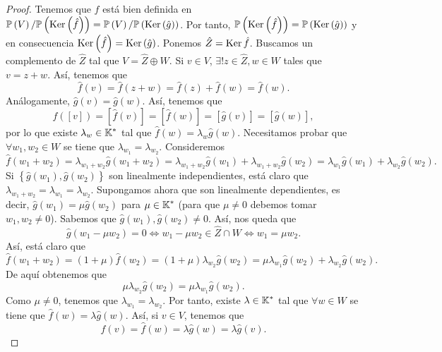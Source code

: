 \begin{proof}
	Tenemos que $\displaystyle f $ está bien definida en $\displaystyle \mathbb{P}\left(V\right)/\mathbb{P}\left(\operatorname{Ker}\left(\hat{f}\right)\right) = \mathbb{P}\left(V\right)/\mathbb{P}\left(\operatorname{Ker}\left(\hat{g}\right)\right) $. Por tanto, $\displaystyle \mathbb{P}\left(\operatorname{Ker}\left(\hat{f}\right)\right) = \mathbb{P}\left(\operatorname{Ker}\left(\hat{g}\right)\right) $ y en consecuencia $\displaystyle \operatorname{Ker}\left(\hat{f}\right) = \operatorname{Ker}\left(\hat{g}\right) $. Ponemos $\displaystyle \hat{Z} = \operatorname{Ker} \hat{f}$. 
	Buscamos un complemento de $\displaystyle \hat{Z} $ tal que $\displaystyle V = \hat{Z} \oplus W $. Si $\displaystyle v \in V $, $\displaystyle \exists ! z \in \hat{Z}, w \in W $ tales que $\displaystyle v = z + w $. Así, tenemos que 
	\[\hat{f}\left(v\right) = \hat{f}\left(z + w\right) = \hat{f}\left(z\right) + \hat{f}\left(w\right) = \hat{f}\left(w\right) .\]
	Análogamente, $\displaystyle \hat{g}\left(v\right) = \hat{g}\left(w\right) $. Así, tenemos que 
	\[f\left([v]\right) = [\hat{f}\left(v\right)] = [\hat{f}\left(w\right)] = [\hat{g}\left(v\right)] = [\hat{g}\left(w\right)] ,\]
	por lo que existe $\displaystyle \lambda_{w} \in \mathbb{K}^{*} $ tal que $\displaystyle \hat{f}\left(w\right) = \lambda_{w}\hat{g}\left(w\right) $. Necesitamos probar que $\displaystyle \forall w_{1}, w_{2} \in W $ se tiene que $\displaystyle \lambda_{w_{1}} = \lambda_{w_{2}} $. Consideremos 
	\[\hat{f}\left(w_{1} + w_{2}\right) = \lambda_{w_{1} + w_{2}}\hat{g}\left(w_{1} + w_{2}\right) = \lambda_{w_{1} + w_{2}}\hat{g}\left(w_{1}\right) + \lambda_{w_{1}+w_{2}}\hat{g}\left(w_{2}\right) = \lambda_{w_{1}}\hat{g}\left(w_{1}\right) + \lambda_{w_{2}}\hat{g}\left(w_{2}\right) .\]
	Si $\displaystyle \left\{ \hat{g}\left(w_{1}\right), \hat{g}\left(w_{2}\right)\right\}  $ son linealmente independientes, está claro que $\displaystyle \lambda_{w_{1}+w_{2}} = \lambda_{w_{1}} = \lambda_{w_{2}} $. Supongamos ahora que son linealmente dependientes, es decir, $\displaystyle \hat{g}\left(w_{1}\right)= \mu\hat{g}\left(w_{2}\right) $ para $\displaystyle \mu \in \mathbb{K}^{*} $ (para que $\displaystyle \mu \neq 0 $ debemos tomar $\displaystyle w_{1}, w_{2} \neq 0 $). Sabemos que $\displaystyle \hat{g}\left(w_{1}\right), \hat{g}\left(w_{2}\right) \neq 0 $. Así, nos queda que
	\[\hat{g}\left(w_{1}-\mu w_{2}\right) = 0 \iff w_{1} - \mu w_{2} \in \hat{Z} \cap W \iff w_{1} = \mu w_{2} .\]
Así, está claro que 
\[\hat{f}\left(w_{1} + w_{2}\right) = \left(1+\mu\right)\hat{f}\left(w_{2}\right) = \left(1+\mu\right)\lambda_{w_{2}}\hat{g}\left(w_{2}\right) = \mu\lambda_{w_{1}}\hat{g}\left(w_{2}\right) + \lambda_{w_{2}}\hat{g}\left(w_{2}\right) .\]
De aquí obtenemos que
\[ \mu \lambda_{w_{2}}\hat{g}\left(w_{2}\right) = \mu\lambda_{w_{1}}\hat{g}\left(w_{2}\right).\]
		Como $\displaystyle \mu \neq 0 $, tenemos que $\displaystyle \lambda_{w_{1}} = \lambda_{w_{2}} $. Por tanto, existe $\displaystyle \lambda \in \mathbb{K}^{*} $ tal que $\displaystyle \forall w \in W $ se tiene que $\displaystyle \hat{f} \left(w\right) = \lambda \hat{g}\left(w\right) $. Así, si $\displaystyle v \in V $, tenemos que 
	\[\hat{f}\left(v\right) = \hat{f}\left(w\right) = \lambda \hat{g}\left(w\right) = \lambda \hat{g}\left(v\right) .\]
\end{proof}

